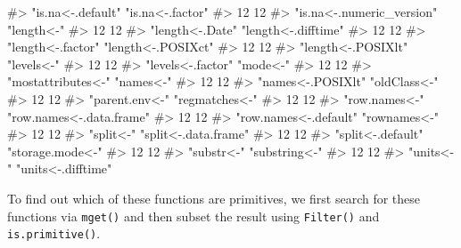 \documentclass[
]{krantz}
\makeatletter
\newenvironment{Shaded}{\begin{snugshade}}{\end{snugshade}}
\newcommand{\CommentTok}[1]{\textcolor[rgb]{0.56,0.35,0.01}{\textit{#1}}}
\newenvironment{kframe}{%
\medskip{}
\setlength{\fboxsep}{.8em}
 \def\at@end@of@kframe{}%
 \ifinner\ifhmode%
  \def\at@end@of@kframe{\end{minipage}}%
  \begin{minipage}{\columnwidth}%
 \fi\fi%
 \def\FrameCommand##1{\hskip\@totalleftmargin \hskip-\fboxsep
 \colorbox{shadecolor}{##1}\hskip-\fboxsep
     \hskip-\linewidth \hskip-\@totalleftmargin \hskip\columnwidth}%
 \MakeFramed {\advance\hsize-\width
   \@totalleftmargin\z@ \linewidth\hsize
   \@setminipage}}%
 {\par\unskip\endMakeFramed%
 \at@end@of@kframe}
\renewenvironment{Shaded}{\begin{kframe}}{\end{kframe}}
\renewcommand{\CommentTok} [1]{\textcolor[rgb]{0.38,0.63,0.69}{{#1}}}
\makeatother
\begin{document}
\begin{Shaded}
\begin{Highlighting}[]
\CommentTok{#>         "is.na<-.default"          "is.na<-.factor" }
\CommentTok{#>                        12                        12 }
\CommentTok{#> "is.na<-.numeric_version"                "length<-" }
\CommentTok{#>                        12                        12 }
\CommentTok{#>           "length<-.Date"       "length<-.difftime" }
\CommentTok{#>                        12                        12 }
\CommentTok{#>         "length<-.factor"        "length<-.POSIXct" }
\CommentTok{#>                        12                        12 }
\CommentTok{#>        "length<-.POSIXlt"                "levels<-" }
\CommentTok{#>                        12                        12 }
\CommentTok{#>         "levels<-.factor"                  "mode<-" }
\CommentTok{#>                        12                        12 }
\CommentTok{#>        "mostattributes<-"                 "names<-" }
\CommentTok{#>                        12                        12 }
\CommentTok{#>         "names<-.POSIXlt"              "oldClass<-" }
\CommentTok{#>                        12                        12 }
\CommentTok{#>            "parent.env<-"            "regmatches<-" }
\CommentTok{#>                        12                        12 }
\CommentTok{#>             "row.names<-"  "row.names<-.data.frame" }
\CommentTok{#>                        12                        12 }
\CommentTok{#>     "row.names<-.default"              "rownames<-" }
\CommentTok{#>                        12                        12 }
\CommentTok{#>                 "split<-"      "split<-.data.frame" }
\CommentTok{#>                        12                        12 }
\CommentTok{#>         "split<-.default"          "storage.mode<-" }
\CommentTok{#>                        12                        12 }
\CommentTok{#>                "substr<-"             "substring<-" }
\CommentTok{#>                        12                        12 }
\CommentTok{#>                 "units<-"        "units<-.difftime"}
\end{Highlighting}
\end{Shaded}

To find out which of these functions are primitives, we first search for these functions via \texttt{mget()} and then subset the result using \texttt{Filter()} and \texttt{is.primitive()}.
\end{document}
